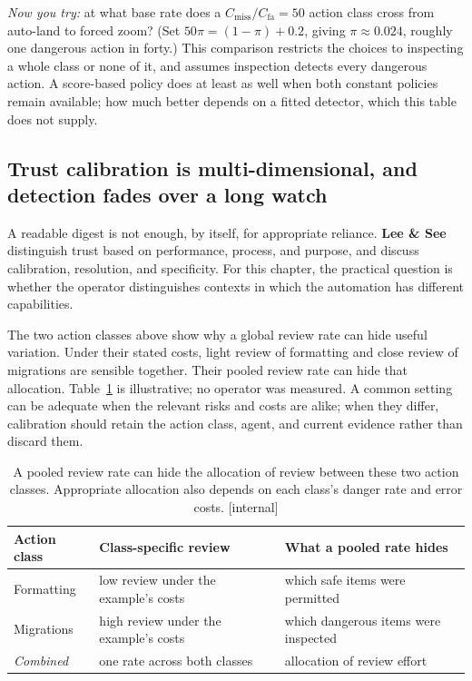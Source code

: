 \documentclass[11pt,a4paper]{article}
\theoremstyle{definition}
\theoremstyle{plain}
\begin{document}
\emph{Now you try:} at what base rate does a $C_{\text{miss}}/C_{\text{fa}}=50$
action class cross from auto-land to forced zoom? (Set $50\pi = (1-\pi)+0.2$, giving
$\pi \approx 0.024$, roughly one dangerous action in forty.) This comparison
restricts the choices to inspecting a whole class or none of it, and assumes
inspection detects every dangerous action. A score-based policy does at least as
well when both constant policies remain available; how much better depends on a
fitted detector, which this table does not supply.

\subsection{Trust calibration is multi-dimensional, and detection fades over a long watch}\label{sec:calibration}

A readable digest is not enough, by itself, for appropriate reliance.
\textbf{Lee \& See} distinguish trust based on performance,
process, and purpose, and discuss calibration, resolution, and specificity.
For this chapter, the practical question is whether the operator distinguishes
contexts in which the automation has different capabilities.

The two action classes above show why a global review rate can hide useful
variation. Under their stated costs, light review of formatting and close review
of migrations are sensible together. Their pooled review rate can hide that
allocation. Table~\ref{tab:trust-calibration} is illustrative; no operator was
measured. A common setting can be adequate when
the relevant risks and costs are alike; when they differ, calibration should
retain the action class, agent, and current evidence rather than discard them.

\begin{table}[tp]
\centering
\small
\renewcommand{\arraystretch}{1.25}
\setlength{\tabcolsep}{4pt}
\begin{tabularx}{\textwidth}{@{}>{\raggedright\arraybackslash}p{} >{\raggedright\arraybackslash}X >{\raggedright\arraybackslash}X@{}}
\toprule
\textbf{Action class} & \textbf{Class-specific review} & \textbf{What a pooled rate hides} \\
\midrule
Formatting & low review under the example's costs & which safe items were permitted \\
Migrations & high review under the example's costs & which dangerous items were inspected \\
\emph{Combined} & one rate across both classes & allocation of review effort \\
\bottomrule
\end{tabularx}
\caption{A pooled review rate can hide the allocation of review
between these two action classes. Appropriate allocation also depends on each
class's danger rate and error costs. [internal]}
\label{tab:trust-calibration}
\end{table}
\end{document}
